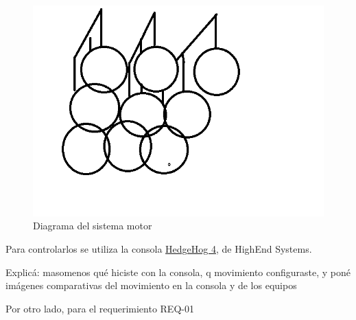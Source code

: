 \begin{figure}[!ht]
	\centering
	\includegraphics[width=15cm,scale=1]{resources/4_1-matriz3x3updowns.png}
	\caption{Diagrama del sistema motor}
	\label{fig:\thefigure}
\end{figure}

Para controlarlos se utiliza la consola \href{http://www.lighttrader.com/images/HI61020007_L.JPG}{HedgeHog 4}, de HighEnd Systems. 


\textcolor{FIXME}{Explicá: masomenos qué hiciste con la consola, q movimiento configuraste, y poné imágenes comparativas del movimiento en la consola y de los equipos}



Por otro lado, para el requerimiento REQ-01



